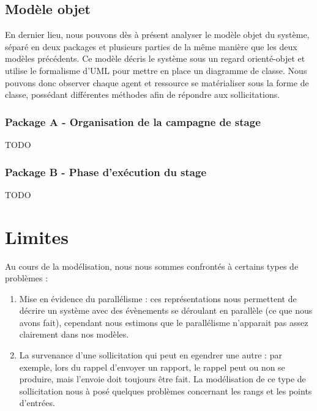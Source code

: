 \documentclass[12pt,a4paper]{article}
\begin{document}
\newpage {} 

\restoregeometry {} \newpage

\newpage {} 

\restoregeometry {} \newpage

\newpage {} 

\restoregeometry {} \newpage

\subsection{Modèle objet}

En dernier lieu, nous pouvons dès à présent analyser le modèle objet du système,
séparé en deux packages et plusieurs parties de la même manière que les deux
modèles précédents. Ce modèle décris le système sous un regard orienté-objet
et utilise le formalisme d'UML pour mettre en place un diagramme de classe. Nous
pouvons donc observer chaque agent et ressource se matérialiser sous la forme de
classe, possédant différentes méthodes afin de répondre aux sollicitations.

\subsubsection{Package A - Organisation de la campagne de stage}

TODO

\subsubsection{Package B - Phase d'exécution du stage}

TODO

\section{Limites}

Au cours de la modélisation, nous nous sommes confrontés à certains types de
problèmes :
\begin{enumerate}
    \item Mise en évidence du parallélisme : ces représentations nous permettent
        de décrire un système avec des évènements se déroulant en parallèle (ce
        que nous avons fait), cependant nous estimons que le parallélisme
        n'apparait pas assez clairement dans nos modèles.
    \item La survenance d'une sollicitation qui peut en egendrer une autre : par
        exemple, lors du rappel d'envoyer un rapport, le rappel peut ou non se
        produire, mais l'envoie doit toujours être fait. La modélisation de ce
        type de sollicitation nous à posé quelques problèmes concernant les
        rangs et les points d'entrées.
\end{enumerate}
\end{document}

